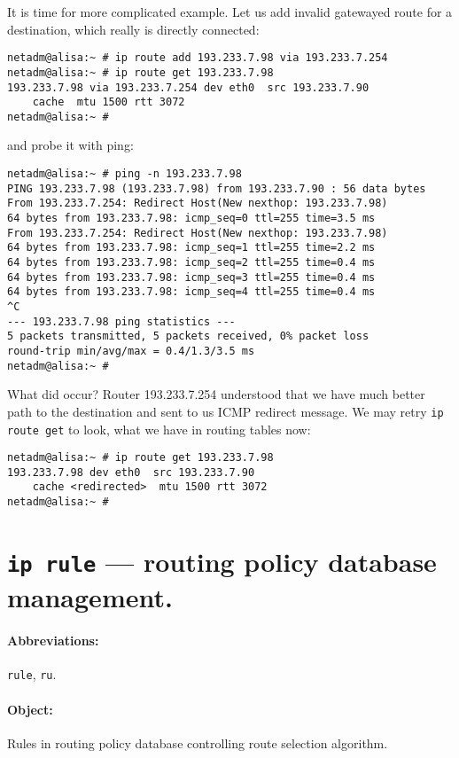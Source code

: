 It is time for more complicated example. Let us add invalid
gatewayed route for a destination, which really is directly connected:
\begin{verbatim}
netadm@alisa:~ # ip route add 193.233.7.98 via 193.233.7.254
netadm@alisa:~ # ip route get 193.233.7.98
193.233.7.98 via 193.233.7.254 dev eth0  src 193.233.7.90
    cache  mtu 1500 rtt 3072
netadm@alisa:~ #
\end{verbatim}
and probe it with ping:
\begin{verbatim}
netadm@alisa:~ # ping -n 193.233.7.98
PING 193.233.7.98 (193.233.7.98) from 193.233.7.90 : 56 data bytes
From 193.233.7.254: Redirect Host(New nexthop: 193.233.7.98)
64 bytes from 193.233.7.98: icmp_seq=0 ttl=255 time=3.5 ms
From 193.233.7.254: Redirect Host(New nexthop: 193.233.7.98)
64 bytes from 193.233.7.98: icmp_seq=1 ttl=255 time=2.2 ms
64 bytes from 193.233.7.98: icmp_seq=2 ttl=255 time=0.4 ms
64 bytes from 193.233.7.98: icmp_seq=3 ttl=255 time=0.4 ms
64 bytes from 193.233.7.98: icmp_seq=4 ttl=255 time=0.4 ms
^C
--- 193.233.7.98 ping statistics ---
5 packets transmitted, 5 packets received, 0% packet loss
round-trip min/avg/max = 0.4/1.3/3.5 ms
netadm@alisa:~ #
\end{verbatim}
What did occur? Router 193.233.7.254 understood that we have much
better path to the destination and sent to us ICMP redirect message.
We may retry \verb|ip route get| to look, what we have in routing
tables now:
\begin{verbatim}
netadm@alisa:~ # ip route get 193.233.7.98
193.233.7.98 dev eth0  src 193.233.7.90 
    cache <redirected>  mtu 1500 rtt 3072
netadm@alisa:~ #
\end{verbatim}



\section{{\tt ip rule} --- routing policy database management.}
\label{IP-RULE}

\paragraph{Abbreviations:} \verb|rule|, \verb|ru|.

\paragraph{Object:} Rules in routing policy database controlling
route selection algorithm.

